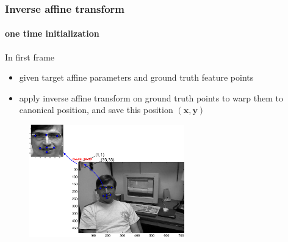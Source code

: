 \begin{frame}
\frametitle{Inverse affine transform}
\framesubtitle{one time initialization}
\logoCSIPCPL\mypagenum
In first frame
\begin{itemize}
\item given target affine parameters and ground truth feature points
\item apply inverse affine transform on ground truth points to warp them to canonical position, and save this position $(\mathbf{x, y})$
\end{itemize}
\begin{figure}[t]
\centering
\includegraphics[width=0.6\textwidth]{thesis/dataset_Dudek_00001_inverseAffine.pdf}
\label{fig:original_feature_points}
\end{figure}
\end{frame}




